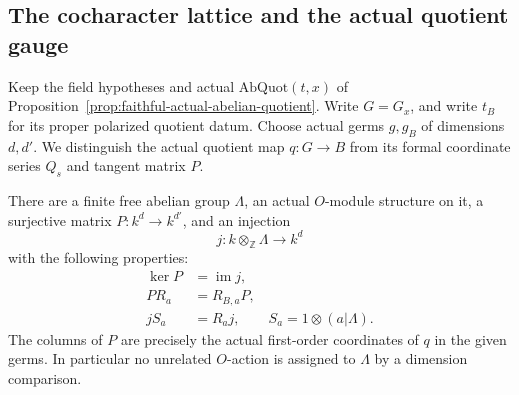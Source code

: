 \subsection{The cocharacter lattice and the actual quotient gauge}
\label{subsec:faithful-quotient-lattice-gauge}

Keep the field hypotheses and actual
\(\mathrm{AbQuot}(t,x)\) of
Proposition~\ref{prop:faithful-actual-abelian-quotient}.
Write \(G=G_x\), and write \(t_B\) for its proper polarized
quotient datum.  Choose actual germs \(g,g_B\) of dimensions
\(d,d'\).  We distinguish the actual quotient map \(q:G\to B\)
from its formal coordinate series \(Q_s\) and tangent matrix \(P\).

\begin{srproposition}
\label{prop:faithful-quotient-cocharacter-lattice}
There are a finite free abelian group \(\Lambda\), an actual
\(O\)-module structure on it, a surjective matrix
\(P:k^d\to k^{d'}\), and an injection
\[
                  j:k\otimes_{\mathbb Z}\Lambda\longrightarrow k^d
\]
with the following properties:
\[
 \begin{split}
 \ker P&=\operatorname{im}j,\\
 P R_a&=R_{B,a}P,\\
 j S_a&=R_a j,\qquad
 S_a=1\otimes(a|\Lambda).
 \end{split}
 \tag{QL1}\label{eq:faithful-quotient-lattice}
\]
The columns of \(P\) are precisely the actual first-order
coordinates of \(q\) in the given germs.
In particular no unrelated \(O\)-action is assigned to
\(\Lambda\) by a dimension comparison.
\end{srproposition}
